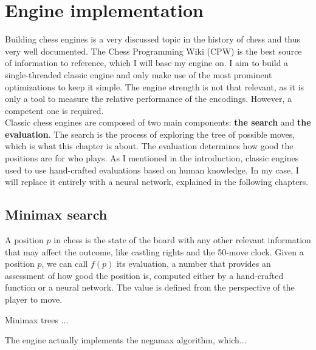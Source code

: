 \section{Engine implementation}

Building chess engines is a very discussed topic in the history of chess and thus very well documented. The Chess Programming Wiki (CPW) \cite{cpw} is the best source of information to reference, which I will base my engine on. I aim to build a single-threaded classic engine and only make use of the most prominent optimizations to keep it simple. The engine strength is not that relevant, as it is only a tool to measure the relative performance of the encodings. However, a competent one is required. \\

Classic chess engines are composed of two main components: \textbf{the search} and \textbf{the evaluation}. The search is the process of exploring the tree of possible moves, which is what this chapter is about. The evaluation determines how good the positions are for who plays. As I mentioned in the introduction, classic engines used to use hand-crafted evaluations based on human knowledge. In my case, I will replace it entirely with a neural network, explained in the following chapters.

\subsection{Minimax search}

A position $p$ in chess is the state of the board with any other relevant information that may affect the outcome, like castling rights and the 50-move clock. Given a position $p$, we can call $f(p)$ its evaluation, a number that provides an assessment of how good the position is, computed either by a hand-crafted function or a neural network. The value is defined from the perspective of the player to move.

Minimax trees \cite{minimax-survey:1995} ...


The engine actually implements the negamax algorithm, which...

